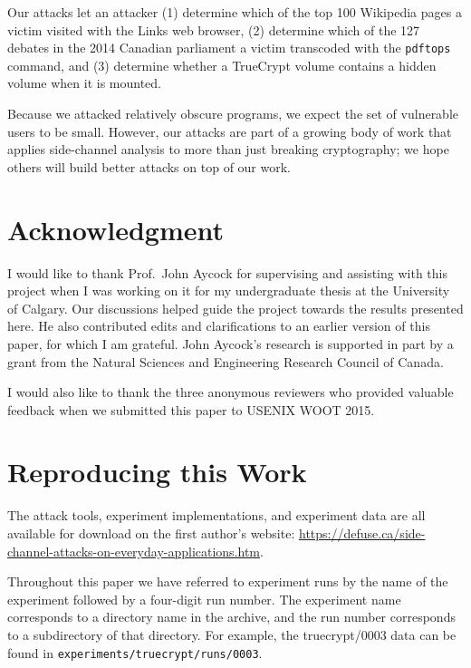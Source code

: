 \documentclass[letterpaper,twocolumn,10pt]{article}
\begin{document}
Our attacks let an attacker (1) determine which of the top 100 Wikipedia pages
a victim visited with the Links web browser, (2) determine which of the 127
debates in the 2014 Canadian parliament a victim transcoded with the
\texttt{pdftops} command, and (3) determine whether a TrueCrypt volume contains
a hidden volume when it is mounted.

Because we attacked relatively obscure programs, we expect the set of vulnerable
users to be small. However, our attacks are part of a growing body of work that
applies side-channel analysis to more than just breaking cryptography; we hope
others will build better attacks on top of our work.

\section*{Acknowledgment}

I would like to thank Prof.\ John Aycock for supervising and assisting with this
project when I was working on it for my undergraduate thesis at the University
of Calgary. Our discussions helped guide the project towards the results
presented here. He also contributed edits and clarifications to an earlier
version of this paper, for which I am grateful. John Aycock's research is
supported in part by a grant from the Natural Sciences and Engineering Research
Council of Canada.

I would also like to thank the three anonymous reviewers who provided valuable
feedback when we submitted this paper to USENIX WOOT 2015.

{\footnotesize 
}

\appendix
\section{Reproducing this Work}
\label{sec:reproducing}

The attack tools, experiment implementations, and experiment data are all
available for download on the first author's website:
\url{https://defuse.ca/side-channel-attacks-on-everyday-applications.htm}.

Throughout this paper we have referred to experiment runs by the name of the
experiment followed by a four-digit run number. The experiment name
corresponds to a directory name in the archive, and the run number
corresponds to a subdirectory of that directory. For example, the
truecrypt/0003 data can be found in
\texttt{experiments/truecrypt/runs/0003}.
\end{document}
